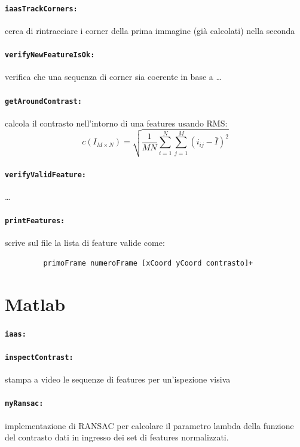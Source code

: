 \documentclass[12pt]{report}
\begin{document}
\paragraph*{\verb_iaasTrackCorners:_} cerca di rintracciare i corner della prima immagine (gi\`a calcolati) nella seconda

\paragraph*{\verb_verifyNewFeatureIsOk:_} verifica che una sequenza di corner sia coerente in base a \dots

\paragraph*{\verb_getAroundContrast:_} calcola il contrasto nell'intorno di una features usando RMS: $$ c\left(I_{M\times N}\right) = \sqrt{\frac{1}{MN}\sum_{i=1}^N\sum_{j=1}^M(i_{ij}-\bar{I})^2} $$

\paragraph*{\verb_verifyValidFeature:_} \dots


\paragraph*{\verb_printFeatures:_} scrive sul file la lista di feature valide come:
\begin{verbatim}
	     primoFrame numeroFrame [xCoord yCoord contrasto]+
\end{verbatim}

\section{Matlab}

\paragraph*{\verb_iaas:_}

\paragraph*{\verb_inspectContrast:_} stampa a video le sequenze di features per un'ispezione visiva

\paragraph*{\verb_myRansac:_} implementazione di RANSAC per calcolare il parametro lambda della funzione del contrasto dati in ingresso dei set di features normalizzati.
\end{document}
